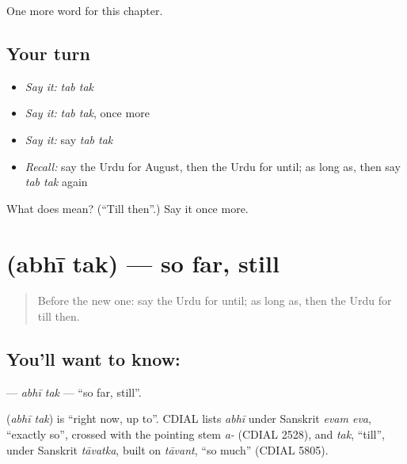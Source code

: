\begin{grammarlens}[title={What you've built}]
One more word for this chapter.
\end{grammarlens}

\subsection*{Your turn}
\begin{itemize}
\raggedright
  \item \emph{Say it:} \emph{tab tak}
  \item \emph{Say it:} \emph{tab tak}, once more
  \item \emph{Say it:} say \emph{tab tak}
  \item \emph{Recall:} say the Urdu for August, then the Urdu for until; as long as, then say \emph{tab tak} again
\end{itemize}

\begin{tcolorbox}[breakable,colback=teal!4,colframe=teal!35!black,title={Before you move on}]
What does   mean? (\textquotedblleft{}Till then\textquotedblright{}.) Say it once more.
\end{tcolorbox}
\section[\texorpdfstring{\ur{ابھی} \ur{تک} (abhī tak)}{ابھی تک (abhī tak)}]{  (abhī tak) — so far, still}

\label{lesson:UR-C189-abhi-tak}



\begin{quote}
Before the new one: say the Urdu for until; as long as, then the Urdu for till then.
\end{quote}

\subsection*{You'll want to know:  }
\textbf{ } — \emph{abhī tak} — \textquotedblleft{}so far, still\textquotedblright{}.

\begin{cousinweb}
\textbf{ } (\emph{abhī tak}) is \textquotedblleft{}right now, up to\textquotedblright{}. CDIAL lists \emph{abhī} under Sanskrit \emph{evam eva}, \textquotedblleft{}exactly so\textquotedblright{}, crossed with the pointing stem \emph{a-} (CDIAL 2528), and \emph{tak}, \textquotedblleft{}till\textquotedblright{}, under Sanskrit \emph{tāvatka}, built on \emph{tāvant}, \textquotedblleft{}so much\textquotedblright{} (CDIAL 5805).
\end{cousinweb}

